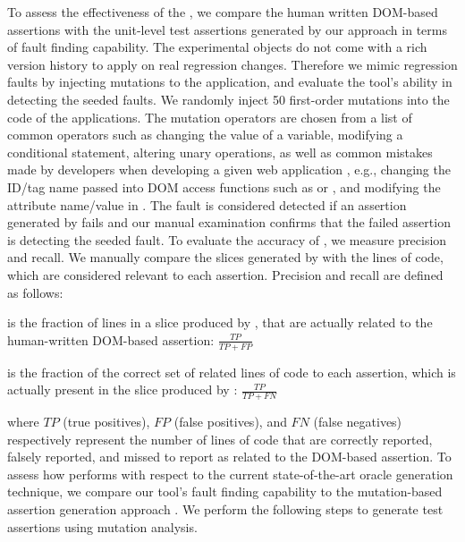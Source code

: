  To assess the effectiveness of the \tool, we compare the human written DOM-based assertions with the unit-level test assertions generated by our approach in terms of fault finding capability.
The experimental objects do not come with a rich version history to apply \tool on real regression changes. Therefore we mimic regression faults by injecting mutations to the application, and evaluate the tool's ability in detecting the seeded faults. We randomly inject 50 first-order mutations into the \javascript code of the applications. The mutation operators are chosen from a list of common operators such as changing the value of a variable, modifying a conditional statement, altering unary operations, as well as common mistakes made by developers when developing a given web application \cite{mirshokraie:tse15}, e.g., changing the ID/tag name passed into DOM access functions such as  or , and modifying the attribute name/value in . The fault is considered detected if an assertion generated by \tool fails and our manual examination confirms that the failed assertion is detecting the seeded fault.
 To evaluate the accuracy of \tool, we measure precision and recall. We manually compare the slices generated by \tool with the \javascript lines of code, which are considered relevant to each assertion. Precision and recall are defined as follows:
\begin{description}[noitemsep, nolistsep, font=\normalfont\itshape]
\item [Precision] is the fraction of lines in a slice produced by \tool, that are actually related to the human-written DOM-based assertion: $\frac{TP}{TP+FP}$ 
\item [Recall] is the fraction of the correct set of related lines of code to each assertion, which is actually present in the slice produced by \tool: $\frac{TP}{TP+FN}$ 
\end{description}
where $TP$ (true positives), $FP$ (false positives), and $FN$ (false negatives) respectively represent the number of lines of code that are correctly reported, falsely reported, and missed to report as related to the DOM-based assertion.
 To assess how \tool performs with respect to the current state-of-the-art oracle generation technique, we compare our tool's fault finding capability to the mutation-based assertion generation approach \cite{mirshokraie:icst15, fraser:tse12}. We perform the following steps to generate test assertions using mutation analysis.
